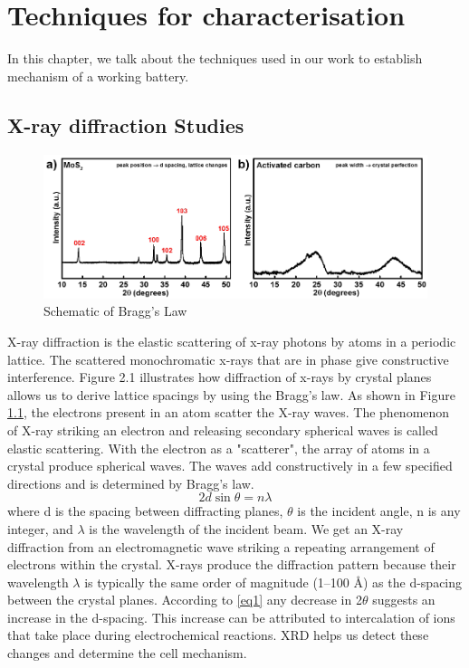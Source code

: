 
\chapter{Techniques for characterisation} %
In this chapter, we talk about the techniques used in our work to establish mechanism of a working battery. 
\label{chap2} %
\section{X-ray diffraction Studies}
\begin{figure}[tbh!]
\centering
\includegraphics[width=\textwidth]{Figures/chap2fig/XRD}
\caption{Schematic of Bragg's Law}
\label{Figures/chap2fig:XRD}
\end{figure}
X-ray diffraction is the elastic scattering of x-ray photons by atoms in a periodic lattice. The scattered monochromatic x-rays that are in phase give constructive interference. Figure 2.1 illustrates how diffraction of x-rays by crystal planes allows us to derive lattice spacings by using the Bragg's law. As shown in Figure \ref{Figures/chap2fig:XRD}, the electrons present in an atom scatter the X-ray waves. The phenomenon of X-ray striking an electron and releasing secondary spherical waves is called elastic scattering. With the electron as a "scatterer", the array of atoms in a crystal produce spherical waves. The waves add constructively in a few specified directions  and is determined by Bragg's law.
 \begin{equation} \label{eq1}
     2d\sin\theta = n{\lambda}
 \end{equation}
where d is the spacing between diffracting planes, $\theta$ is the incident angle, n is any integer, and $\lambda$ is the wavelength of the incident beam. We get an X-ray diffraction from an electromagnetic wave striking a repeating arrangement of electrons within the crystal. X-rays produce the diffraction pattern because their wavelength $\lambda$ is typically the same order of magnitude (1–100 \AA ) as the d-spacing between the crystal planes. According to \ref{eq1} any decrease in 2$\theta$ suggests an increase in the d-spacing. This increase can be attributed to intercalation of ions that take place during electrochemical reactions. XRD helps us detect these changes and determine the cell mechanism.

